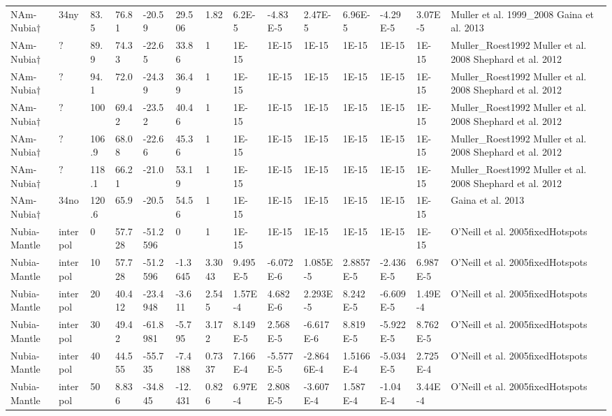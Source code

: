\begin{landscape}
\begin{longtable}{@{}lllllllllllllp{3.5cm}@{}}
NAm-Nubia$\dagger$ & 34ny & 83.5 & 76.81 & -20.59 & 29.506 & 1.82 & 6.2E-5 & -4.83E-5 & 2.47E-5 & 6.96E-5 & -4.29E-5 & 3.07E-5 & Muller et al. 1999\_2008 Gaina et al. 2013 \\
NAm-Nubia$\dagger$ & $\mathord{?}$ & 89.9 & 74.33 & -22.65 & 33.86 & 1 & 1E-15 & 1E-15 & 1E-15 & 1E-15 & 1E-15 & 1E-15 & Muller\_Roest1992 Muller et al. 2008 Shephard et al. 2012 \\
NAm-Nubia$\dagger$ & $\mathord{?}$ & 94.1 & 72.0 & -24.39 & 36.49 & 1 & 1E-15 & 1E-15 & 1E-15 & 1E-15 & 1E-15 & 1E-15 & Muller\_Roest1992 Muller et al. 2008 Shephard et al. 2012 \\
NAm-Nubia$\dagger$ & $\mathord{?}$ & 100 & 69.42 & -23.52 & 40.46 & 1 & 1E-15 & 1E-15 & 1E-15 & 1E-15 & 1E-15 & 1E-15 & Muller\_Roest1992 Muller et al. 2008 Shephard et al. 2012 \\
NAm-Nubia$\dagger$ & $\mathord{?}$ & 106.9 & 68.08 & -22.66 & 45.36 & 1 & 1E-15 & 1E-15 & 1E-15 & 1E-15 & 1E-15 & 1E-15 & Muller\_Roest1992 Muller et al. 2008 Shephard et al. 2012 \\
NAm-Nubia$\dagger$ & $\mathord{?}$ & 118.1 & 66.21 & -21.0 & 53.19 & 1 & 1E-15 & 1E-15 & 1E-15 & 1E-15 & 1E-15 & 1E-15 & Muller\_Roest1992 Muller et al. 2008 Shephard et al. 2012 \\
NAm-Nubia$\dagger$ & 34no & 120.6 & 65.9 & -20.5 & 54.56 & 1 & 1E-15 & 1E-15 & 1E-15 & 1E-15 & 1E-15 & 1E-15 & Gaina et al. 2013 \\
Nubia-Mantle & interpol & 0 & 57.728 & -51.2596 & 0 & 1 & 1E-15 & 1E-15 & 1E-15 & 1E-15 & 1E-15 & 1E-15 & O'Neill et al. 2005fixedHotspots \\
Nubia-Mantle & interpol & 10 & 57.728 & -51.2596 & -1.3645 & 3.3043 & 9.495E-5 & -6.072E-6 & 1.085E-5 & 2.8857E-5 & -2.436E-5 & 6.987E-5 & O'Neill et al. 2005fixedHotspots \\
Nubia-Mantle & interpol & 20 & 40.412 & -23.4948 & -3.611 & 2.545 & 1.57E-4 & 4.682E-6 & 2.293E-5 & 8.242E-5 & -6.609E-5 & 1.49E-4 & O'Neill et al. 2005fixedHotspots \\
Nubia-Mantle & interpol & 30 & 49.42 & -61.8981 & -5.795 & 3.172 & 8.149E-5 & 2.568E-5 & -6.617E-6 & 8.819E-5 & -5.922E-5 & 8.762E-5 & O'Neill et al. 2005fixedHotspots \\
Nubia-Mantle & interpol & 40 & 44.555 & -55.735 & -7.4188 & 0.7337 & 7.166E-4 & -5.577E-5 & -2.8646E-4 & 1.5166E-4 & -5.034E-5 & 2.725E-4 & O'Neill et al. 2005fixedHotspots \\
Nubia-Mantle & interpol & 50 & 8.836 & -34.845 & -12.431 & 0.826 & 6.97E-4 & 2.808E-5 & -3.607E-4 & 1.587E-4 & -1.04E-4 & 3.44E-4 & O'Neill et al. 2005fixedHotspots \\

\end{longtable}
\end{landscape}
